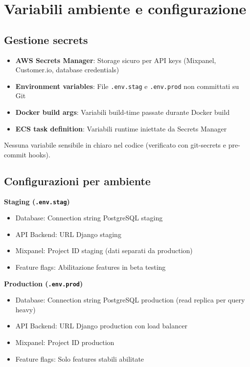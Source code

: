 \section{Variabili ambiente e configurazione}

\subsection{Gestione secrets}
\begin{itemize}
  \item \textbf{AWS Secrets Manager}: Storage sicuro per API keys (Mixpanel, Customer.io, database credentials)
  \item \textbf{Environment variables}: File \texttt{.env.stag} e \texttt{.env.prod} non committati su Git
  \item \textbf{Docker build args}: Variabili build-time passate durante Docker build
  \item \textbf{ECS task definition}: Variabili runtime iniettate da Secrets Manager
\end{itemize}

Nessuna variabile sensibile in chiaro nel codice (verificato con git-secrets e pre-commit hooks).

\subsection{Configurazioni per ambiente}
\textbf{Staging (\texttt{.env.stag})}
\begin{itemize}
  \item Database: Connection string PostgreSQL staging
  \item API Backend: URL Django staging
  \item Mixpanel: Project ID staging (dati separati da production)
  \item Feature flags: Abilitazione features in beta testing
\end{itemize}

\textbf{Production (\texttt{.env.prod})}
\begin{itemize}
  \item Database: Connection string PostgreSQL production (read replica per query heavy)
  \item API Backend: URL Django production con load balancer
  \item Mixpanel: Project ID production
  \item Feature flags: Solo features stabili abilitate
\end{itemize}

